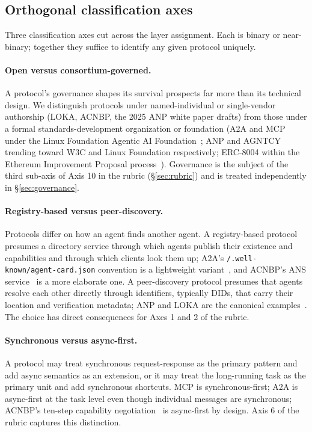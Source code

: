 \subsection{Orthogonal classification axes}
\label{sec:taxonomy:orthogonal}

Three classification axes cut across the layer assignment.
Each is binary or near-binary; together they suffice to
identify any given protocol uniquely.

\paragraph{Open versus consortium-governed.}
A protocol's governance shapes its survival prospects far
more than its technical design. We distinguish protocols
under named-individual or single-vendor authorship (LOKA,
ACNBP, the 2025 ANP white paper drafts) from those under a
formal standards-development organization or foundation
(A2A and MCP under the Linux Foundation Agentic AI
Foundation~\cite{lf_aaif}; ANP and AGNTCY trending toward
W3C and Linux Foundation respectively;
ERC-8004 within the Ethereum Improvement Proposal
process~\cite{spec_erc8004}). Governance is the subject of
the third sub-axis of Axis 10 in the rubric (\S\ref{sec:rubric})
and is treated independently in \S\ref{sec:governance}.

\paragraph{Registry-based versus peer-discovery.}
Protocols differ on how an agent finds another agent. A
registry-based protocol presumes a directory service through
which agents publish their existence and capabilities and
through which clients look them up; A2A's
\texttt{/.well-known/agent-card.json} convention is a
lightweight variant~\cite{spec_a2a}, and ACNBP's ANS
service~\cite{spec_acnbp} is a more elaborate one. A
peer-discovery protocol presumes that agents resolve each
other directly through identifiers, typically DIDs,
that carry their location and verification metadata; ANP and
LOKA are the canonical examples~\cite{spec_anp, spec_loka}.
The choice has direct consequences for Axes 1 and 2 of the
rubric.

\paragraph{Synchronous versus async-first.}
A protocol may treat synchronous request-response as the
primary pattern and add async semantics as an extension, or
it may treat the long-running task as the primary unit and
add synchronous shortcuts. MCP is synchronous-first; A2A is
async-first at the task level even though individual
messages are synchronous; ACNBP's ten-step capability
negotiation~\cite{spec_acnbp} is async-first by design.
Axis 6 of the rubric captures this distinction.

